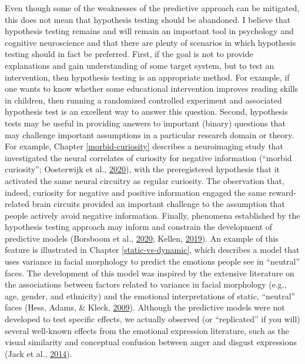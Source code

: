 \documentclass[11pt,american,]{memoir} %
\begin{document}
Even though some of the weaknesses of the predictive approach can be mitigated, this does not mean that hypothesis testing should be abandoned. I believe that hypothesis testing remains and will remain an important tool in psychology and cognitive neuroscience and that there are plenty of scenarios in which hypothesis testing should in fact be preferred. First, if the goal is not to provide explanations and gain understanding of some target system, but to test an intervention, then hypothesis testing is an appropriate method. For example, if one wants to know whether some educational intervention improves reading skills in children, then running a randomized controlled experiment and associated hypothesis test is an excellent way to answer this question. Second, hypothesis tests may be useful in providing answers to important (binary) questions that may challenge important assumptions in a particular research domain or theory. For example, Chapter \ref{morbid-curiosity} describes a neuroimaging study that investigated the neural correlates of curiosity for negative information (``morbid curiosity''; Oosterwijk et al., \protect\hyperlink{ref-Oosterwijk2020-uf}{2020}), with the preregistered hypothesis that it activated the same neural circuitry as regular curiosity. The observation that, indeed, curiosity for negative and positive information engaged the same reward-related brain circuits provided an important challenge to the assumption that people actively avoid negative information. Finally, phenomena established by the hypothesis testing approach may inform and constrain the development of predictive models (Borsboom et al., \protect\hyperlink{ref-Borsboom2020-xg}{2020}; Kellen, \protect\hyperlink{ref-Kellen2019-af}{2019}). An example of this feature is illustrated in Chapter \ref{static-vs-dynamic}, which describes a model that uses variance in facial morphology to predict the emotions people see in ``neutral'' faces. The development of this model was inspired by the extensive literature on the associations between factors related to variance in facial morphology (e.g., age, gender, and ethnicity) and the emotional interpretations of static, ``neutral'' faces (Hess, Adams, \& Kleck, \protect\hyperlink{ref-Hess2009-xo}{2009}). Although the predictive models were not developed to test specific effects, we actually observed (or ``replicated'' if you will) several well-known effects from the emotional expression literature, such as the visual similarity and conceptual confusion between anger and disgust expressions (Jack et al., \protect\hyperlink{ref-Jack2014-ku}{2014}).
\end{document}
